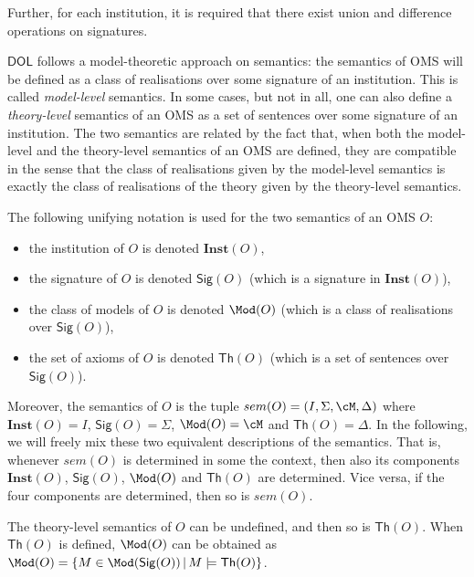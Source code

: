 \documentclass[10pt, a4paper]{isov2}
\newcommand{\Sig}{\mathsf{Sig}}
\renewcommand{\Th}{\mathsf{Th}}
\newcommand{\Inst}{\ensuremath{\mathbf{Inst}}}
\newcommand*{\DOL}{\ensuremath{\mathsf{DOL}}\xspace}
\begin{document}
Further,  for each institution, it is required that there exist union and difference operations on signatures.

\medskip

\DOL follows a model-theoretic approach on semantics: the semantics of OMS will be defined as a class of realisations
over some signature of an institution. This is called \emph{model-level}  semantics. In some cases, but not in all, one can also define
a \emph{theory-level} semantics of an OMS as a set of sentences over some signature of an institution. The two semantics are 
related by the fact that, when both the model-level and the theory-level semantics of an OMS are defined, they are compatible in the 
sense that the class of realisations given by the model-level semantics is exactly the class of realisations of the theory given by the
theory-level semantics. 

 The following unifying notation is used for the two semantics of an OMS $O$:\begin{itemize}
 \item the institution of $O$ is denoted $\Inst(O)$,
  \item the signature of $O$ is denoted $\Sig(O)$ (which is a signature in $\Inst(O)$),
  \item the class of models of $O$ is denoted $\Mod(O)$ (which is a class of realisations over $\Sig(O)$),
  \item the set of axioms of $O$ is denoted $\Th(O)$ (which is a set of sentences over $\Sig(O)$).
\end{itemize}
\noindent Moreover, the semantics of $O$ is the tuple $sem(O) = (I, \Sigma, \cM,\Delta)$
where $\Inst(O) = I$, $\Sig(O) = \Sigma$, $\Mod(O) = \cM$ and $\Th(O) = \Delta$.
In the following, we will freely mix these two equivalent descriptions of the semantics. That is, whenever $sem(O)$ is determined in some the context, then also its components $\Inst(O)$, $\Sig(O)$, $\Mod(O)$ and $\Th(O)$ are determined. Vice versa, if the four components are determined, then so is $sem(O)$.

The theory-level semantics of $O$ can be undefined, and then so is $\Th(O)$. When $\Th(O)$ is defined, $\Mod(O)$ can be obtained as $\Mod(O)=\{M\in\Mod(\Sig(O)) \,|\, M\models\Th(O)\}$.
\end{document}
